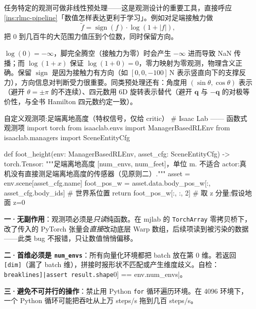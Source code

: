 任务特定的观测可做非线性预处理——这是观测设计的重要工具，直接呼应 \cref{ins:rlmc-pipeline}「数值怎样表达更利于学习」。例如对足端接触力做
\begin{equation}
\tilde f = \operatorname{sign}(f)\cdot\log(1+\lvert f\rvert),
\label{eq:rlmc-log1p}
\end{equation}
把 $0$ 到几百牛的大范围力值压到个位数，同时保留方向。

\begin{insight}\label{ins:rlmc-log1p}
$\log(0)=-\infty$，脚完全腾空（接触力为零）时会产生 $-\infty$ 进而导致 NaN 传播；而 $\log(1+x)$ 保证 $\log(1+0)=0$，零力映射为零观测，物理含义正确。保留 $\operatorname{sign}$ 是因为接触力有方向（如 $[0,0,-100]\,$N 表示竖直向下的支撑反力），方向信息对判断受力很重要。同类预处理还有：角度用 $(\sin\theta,\cos\theta)$ 表示（避开 $\theta=\pm\pi$ 的不连续）、四元数用 6D 旋转表示替代（避开 $\mathbf q$ 与 $-\mathbf q$ 的对极等价性，与全书 Hamilton 四元数约定一致）。
\end{insight}

\begin{codebox}[Python]{自定义观测项:足端离地高度（特权信号，仅给 critic）}
# Isaac Lab —— 函数式观测项
import torch
from isaaclab.envs import ManagerBasedRLEnv
from isaaclab.managers import SceneEntityCfg

def foot_height(env: ManagerBasedRLEnv, asset_cfg: SceneEntityCfg) -> torch.Tensor:
    """足端离地高度 [num_envs, num_feet]，单位 m.
    不适合 actor:真机没有直接测足端离地高度的传感器（见原则二）."""
    asset = env.scene[asset_cfg.name]
    foot_pos_w = asset.data.body_pos_w[:, asset_cfg.body_ids]  # 世界系位置
    return foot_pos_w[:, :, 2]  # 取 z 分量;假设地面 z=0
\end{codebox}

\begin{pitfall}[编写观测项的三条铁律]
\textbf{一·无副作用}：观测项必须是\emph{只读}纯函数。在 mjlab 的 \verb|TorchArray| 零拷贝桥下，改了传入的 PyTorch 张量会\emph{直接}改动底层 Warp 数组，后续项读到被污染的数据——此类 bug 不报错，只让数值悄悄偏移。

\textbf{二·首维必须是 \texttt{num\_envs}}：所有向量化环境都把 batch 放在第 0 维。若返回 \verb|[dim]|（漏了 batch 维），拼接时报形状不匹配或产生维度歧义。自检：\Verb[breaklines]|assert result.shape[0] == env.num_envs|。

\textbf{三·避免不可并行的操作}：禁止用 Python \verb|for| 循环遍历环境。在 4096 环境下，一个 Python 循环可能把吞吐从上万 steps/s 拖到几百 steps/s。
\end{pitfall}

